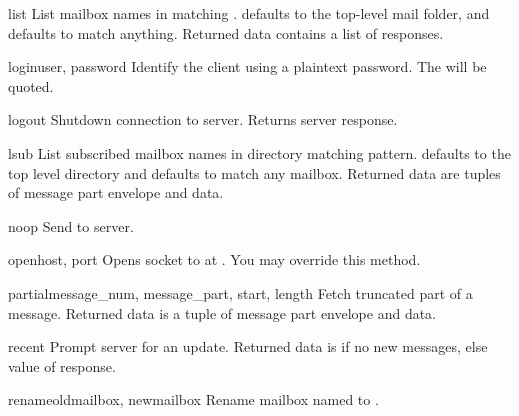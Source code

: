 \begin{methoddesc}{list}{}
  List mailbox names in  matching
  .   defaults to the top-level mail
  folder, and  defaults to match anything.  Returned data
  contains a list of  responses.
\end{methoddesc}

\begin{methoddesc}{login}{user, password}
  Identify the client using a plaintext password.
  The  will be quoted.
\end{methoddesc}

\begin{methoddesc}{logout}{}
  Shutdown connection to server. Returns server  response.
\end{methoddesc}

\begin{methoddesc}{lsub}{}
  List subscribed mailbox names in directory matching pattern.
   defaults to the top level directory and
   defaults to match any mailbox.
  Returned data are tuples of message part envelope and data.
\end{methoddesc}

\begin{methoddesc}{noop}{}
  Send  to server.
\end{methoddesc}

\begin{methoddesc}{open}{host, port}
  Opens socket to  at .
  You may override this method.
\end{methoddesc}

\begin{methoddesc}{partial}{message_num, message_part, start, length}
  Fetch truncated part of a message.
  Returned data is a tuple of message part envelope and data.
\end{methoddesc}

\begin{methoddesc}{recent}{}
  Prompt server for an update. Returned data is  if no new
  messages, else value of  response.
\end{methoddesc}

\begin{methoddesc}{rename}{oldmailbox, newmailbox}
  Rename mailbox named  to .
\end{methoddesc}

